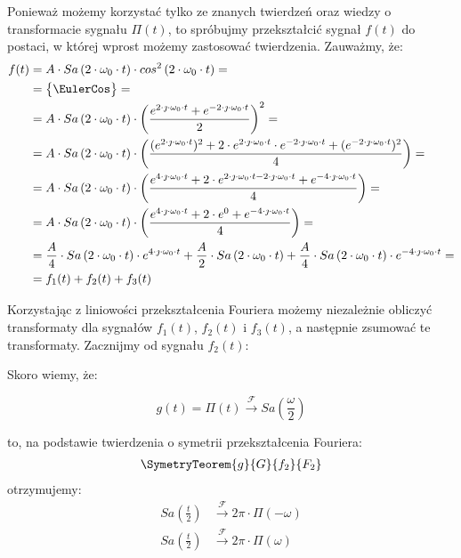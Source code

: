\begin{task}
Ponieważ możemy korzystać tylko ze znanych twierdzeń oraz wiedzy o transformacie sygnału $\Pi(t)$, to spróbujmy przekształcić sygnał $f(t)$ do postaci, w której wprost możemy zastosować twierdzenia. Zauważmy, że:
\begin{align*}
f(t) &= A \cdot Sa\left(2 \cdot \omega_0 \cdot t\right) \cdot cos^2\left(2 \cdot \omega_0 \cdot t\right)=\\
&=\begin{Bmatrix}
\EulerCos
\end{Bmatrix}=\\
&= A \cdot Sa\left(2 \cdot \omega_0 \cdot t\right) \cdot \left(\frac{e^{2 \cdot \jmath \cdot \omega_0 \cdot t}+e^{-2 \cdot \jmath \cdot \omega_0 \cdot t}}{2}\right)^2=\\
&= A \cdot Sa\left(2 \cdot \omega_0 \cdot t\right) \cdot \left(\frac{(e^{2 \cdot \jmath \cdot \omega_0 \cdot t})^2+ 2 \cdot e^{2 \cdot \jmath \cdot \omega_0 \cdot t} \cdot e^{-2 \cdot \jmath \cdot \omega_0 \cdot t}+(e^{-2 \cdot \jmath \cdot \omega_0 \cdot t})^2}{4}\right)=\\
&= A \cdot Sa\left(2 \cdot \omega_0 \cdot t\right) \cdot \left(\frac{e^{4 \cdot \jmath \cdot \omega_0 \cdot t}+ 2 \cdot e^{2 \cdot \jmath \cdot \omega_0 \cdot t -2 \cdot \jmath \cdot \omega_0 \cdot t}+e^{-4 \cdot \jmath \cdot \omega_0 \cdot t}}{4}\right)=\\
&= A \cdot Sa\left(2 \cdot \omega_0 \cdot t\right) \cdot \left(\frac{e^{4 \cdot \jmath \cdot \omega_0 \cdot t}+ 2 \cdot e^{0}+e^{-4 \cdot \jmath \cdot \omega_0 \cdot t}}{4}\right)=\\
&= \frac{A}{4} \cdot Sa\left(2 \cdot \omega_0 \cdot t\right) \cdot e^{4 \cdot \jmath \cdot \omega_0 \cdot t} + \frac{A}{2} \cdot Sa\left(2 \cdot \omega_0 \cdot t\right) +\frac{A}{4} \cdot Sa\left(2 \cdot \omega_0 \cdot t\right) \cdot e^{-4 \cdot \jmath \cdot \omega_0 \cdot t}=\\
&= f_1(t)+f_2(t)+f_3(t)
\end{align*}

Korzystając z liniowości przekształcenia Fouriera możemy niezależnie obliczyć transformaty dla sygnałów $f_1(t)$, $f_2(t)$ i $f_3(t)$, a następnie zsumować te transformaty. Zacznijmy od sygnału $f_2(t)$:

Skoro wiemy, że:

\begin{equation}
g(t) = \Pi(t) \xrightarrow{\mathcal F} Sa\left(\frac{\omega}{2}\right)
\end{equation}

to, na podstawie twierdzenia o symetrii przekształcenia Fouriera:
\begin{align*}
\SymetryTeorem{g}{G}{f_2}{F_2}
\end{align*}
otrzymujemy:
\begin{align*}
Sa\left(\frac{t}{2}\right) &\xrightarrow{\mathcal F} 2\pi \cdot \Pi(-\omega)\\
Sa\left(\frac{t}{2}\right) &\xrightarrow{\mathcal F} 2\pi \cdot \Pi(\omega)
\end{align*}


\end{task}
